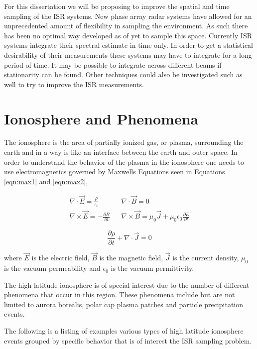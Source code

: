 For this dissertation we will be proposing to improve the spatial and time sampling of the ISR systems.  New phase array radar systems have allowed for an unprecedented amount of flexibility in sampling the environment.  As such there has been no optimal way developed as of yet to sample this space.  Currently ISR systems integrate their spectral estimate in time only.  In order to get a statistical desirability of their measurements these systems may have to integrate for a long period of time.  It may be possible to integrate across different beams if stationarity can be found.  Other techniques could also be investigated such as well to try to improve the ISR measurements.


\section{Ionosphere and Phenomena}
The ionosphere is the area of partially ionized gas, or plasma, surrounding the earth and in a way is like an interface between the earth and outer space\cite{kellybook}. In order to understand the behavior of the plasma in the ionosphere one needs to use electromagnetics governed by Maxwells Equations seen in Equations \ref{eqn:max1} and \ref{eqn:max2},

\begin{eqnarray}
\label{eqn:max1}
\nabla \cdot \vec{E} = \frac{\rho}{\epsilon_0}\  &&\nabla  \cdot \vec{B} = 0 \nonumber \\
\nabla  \times \vec{E} = - \frac{\partial B}{\partial t} && \nabla  \times \vec{B} = \mu_{0}\vec{J} +
\mu_{0}\epsilon_{0}\frac{\partial E}{\partial t}
\end{eqnarray}

\begin{equation}
\label{eqn:max2}
\frac{\partial \rho}{\partial t}+\nabla \cdot \vec{J} = 0
\end{equation}
 
\noindent where $\vec{E}$ is the electric field, $\vec{B}$ is the magnetic field, $\vec{J}$ is the current density, $\mu_0$ is the vacuum permeability and $\epsilon_0$ is the vacuum permittivity.

The high latitude ionosphere is of special interest due to the number of different phenomena that occur in this region.  These phenomena include but are not limited to aurora borealis, polar cap plasma patches and particle precipitation events.  

The following is a listing of examples various types of high latitude ionosphere events grouped by specific behavior that is of interest the ISR sampling problem.


